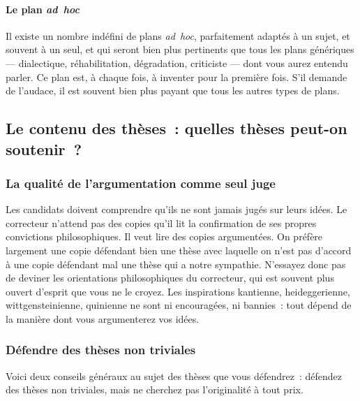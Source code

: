 \documentclass[a4paper,12pt]{article}
\begin{document}
\paragraph{Le plan \emph{ad hoc}}
\label{sec-3-1-4-6}

Il existe un nombre indéfini de plans \emph{ad hoc}, parfaitement adaptés à
un sujet, et souvent à un seul, et qui seront bien plus pertinents que
tous les plans génériques --- dialectique, réhabilitation, dégradation,
criticiste --- dont vous aurez entendu parler. Ce plan est, à chaque
fois, à inventer pour la première fois. S'il demande de l'audace, il est
souvent bien plus payant que tous les autres types de plans.



\subsection{Le contenu des thèses : quelles thèses peut-on soutenir ?}
\label{sec-3-2}

\subsubsection{La qualité de l'argumentation comme seul juge}
\label{sec-3-2-1}

Les candidats doivent comprendre qu'ils ne sont jamais jugés sur leurs
idées. Le correcteur n'attend pas des copies qu'il lit la confirmation
de ses propres convictions philosophiques. Il veut lire des copies
argumentées. On préfère largement une copie défendant bien une thèse
avec laquelle on n'est pas d'accord à une copie défendant mal une thèse
qui a notre sympathie. N'essayez donc pas de deviner les orientations
philosophiques du correcteur, qui est souvent plus ouvert d'esprit que
vous ne le croyez. Les inspirations kantienne, heideggerienne,
wittgensteinienne, quinienne ne sont ni encouragées, ni bannies : tout
dépend de la manière dont vous argumenterez vos idées.

\subsubsection{Défendre des thèses non triviales}
\label{sec-3-2-2}

Voici deux conseils généraux au sujet des thèses que vous défendrez :
défendez des thèses non triviales, mais ne cherchez pas l'originalité à
tout prix.
\end{document}
